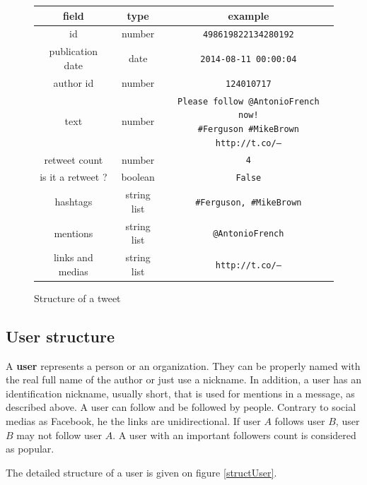 \documentclass[a4paper,twoside,12pt,openright]{report}
\begin{document}
\begin{figure}[h!]
\centering
\begin{tabular}{ccc}
field & type & example\\
\hline
\hline
id & number & \texttt{498619822134280192} \\ \hline
publication date & date & \texttt{2014-08-11 00:00:04} \\ \hline
author id & number & \texttt{124010717} \\ \hline
text & number & \pbox{9cm}{\vspace*{5pt}\texttt{Please follow @AntonioFrench now! \newline \#Ferguson \#MikeBrown http://t.co/---}\vspace*{5pt}} \\ \hline
retweet count & number & \texttt{4} \\ \hline
is it a retweet ? & boolean & \texttt{False} \\ \hline
hashtags & string list & \texttt{\#Ferguson, \#MikeBrown} \\ \hline
mentions & string list & \texttt{@AntonioFrench} \\ \hline
links and medias & string list & \texttt{http://t.co/---} \\ \hline \hline
\end{tabular}
\caption{Structure of a tweet}
\label{structTweet}
\end{figure}

\newpage

\subsection{User structure}
A \textbf{user} represents a person or an organization. They can be properly named with the real full name of the author or just use a nickname. In addition, a user has an identification nickname, usually short, that is used for mentions in a message, as described above. A user can follow and be followed by people. Contrary to social medias as Facebook, he the links are unidirectional. If user $A$ follows user $B$, user $B$ may not follow user $A$. A user with an important followers count is considered as popular.

The detailed structure of a user is given on figure \ref{structUser}.
\end{document}
